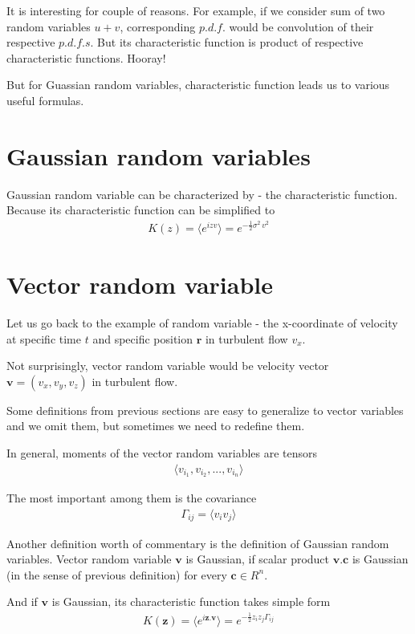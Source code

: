{It is interesting for couple of reasons. For example, if we consider sum of two random variables $u+v$, corresponding $p.d.f.$ would be convolution of their respective $p.d.f.s$. But its characteristic function is product of respective characteristic functions. Hooray!

\bigskip

But for Guassian random variables, characteristic function leads us to various useful formulas.

\section{Gaussian random variables}
Gaussian random variable can be characterized by - the characteristic function.
Because its characteristic function can be simplified to
\begin{align*}
K(z) = \langle e^{izv} \rangle = e^{-\frac{1}{2} \sigma^2 \, v^2}
\end{align*}


\section{Vector random variable}
Let us go back to the example of random variable - the x-coordinate of velocity at specific time $t$ and specific position $\bm{r}$ in turbulent flow $v_x$.

Not surprisingly, vector random variable would be velocity vector $\bm{v} = (v_x,v_y,v_z)$ in turbulent flow.

Some definitions from previous sections are easy to generalize to vector variables and we omit them, but sometimes we need to redefine them.

In general, moments of the vector random variables are tensors
\begin{align}
\langle v_{i_1}, v_{i_2}, ..., v_{i_n} \rangle
\end{align}

The most important among them is the covariance
\begin{align}
\Gamma_{ij} = \langle v_i v_j \rangle
\end{align}

\bigskip
Another definition worth of commentary is the definition of Gaussian random variables.
Vector random variable $\bm{v}$ is Gaussian, if scalar product $\bm{v}.\bm{c}$ is Gaussian (in the sense of previous definition) for every $\bm{c} \in R^n$.

And if $\bm{v}$ is Gaussian, its characteristic function takes simple form
\begin{align}
K(\bm{z}) = \langle e^{i\bm{z}.\bm{v}} \rangle = e^{-\frac{1}{2} z_i z_j \Gamma_{ij}}
\end{align}

}
